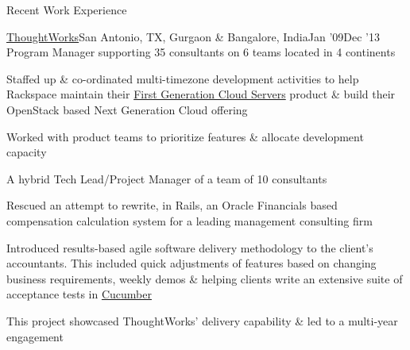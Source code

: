 \documentclass{resume} %
\begin{document}
\begin{rSection}{Recent Work Experience}
\begin{rSubsection}{\href{https://www.thoughtworks.com}{ThoughtWorks}}{San Antonio, TX, Gurgaon \& Bangalore, India}{Jan '09}{Dec '13}
    {Program Manager supporting 35 consultants on 6 teams located in 4 continents}

  \item Staffed up \& co-ordinated multi-timezone development activities to help Rackspace maintain their \href{https://techcrunch.com/2008/10/22/rackspace-acquires-jungledisk-slicehost-to-take-on-amazon-web-services/}{First Generation Cloud Servers} product \& build their OpenStack based Next Generation Cloud offering
    \item Worked with product teams to prioritize features \& allocate development capacity
\end{rSubsection}\vspace{-1em}


\begin{rSubsection}{}{}{}{}
  {A hybrid Tech Lead/Project Manager of a team of 10 consultants}

\item Rescued an attempt to rewrite, in Rails, an Oracle Financials based compensation calculation system for a leading management consulting firm
\item Introduced results-based agile software delivery
  methodology to the client's accountants. This included quick
  adjustments of features based on changing business requirements,
  weekly demos \& helping clients write an extensive suite
  of acceptance tests in \href{https://cucumber.io/}{Cucumber}
\item This project showcased ThoughtWorks' delivery capability \& led to a multi-year engagement

\end{rSubsection}\vspace{-1em}



\end{rSection}
\end{document}
